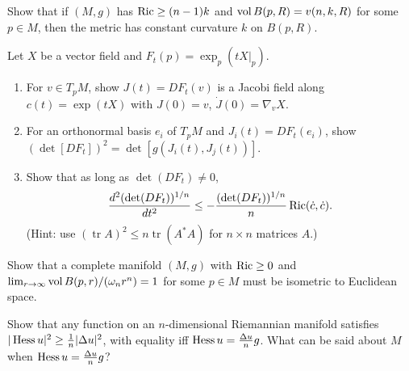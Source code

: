 \begin{remark}
  \label{rem:pet-ch7-ex-8}
  Show that if $(M,g)$ has $\operatorname{Ric}\ge(n-1)k$ and $\operatorname{vol} B(p,R)=v(n,k,R)$ for some
  $p\in M$, then the metric has constant curvature $k$ on $B(p,R)$.
\end{remark}

\begin{remark}
  \label{rem:pet-ch7-ex-9}
  Let $X$ be a vector field and $F_t(p)=\exp_p(tX|_p)$.
  \begin{enumerate}
    \item[(1)] For $v\in T_pM$, show $J(t)=DF_t(v)$ is a Jacobi field along
      $c(t)=\exp(tX)$ with $J(0)=v$, $\dot J(0)=\nabla_vX$.
    \item[(2)] For an orthonormal basis $e_i$ of $T_pM$ and $J_i(t)=DF_t(e_i)$,
      show $(\det[DF_t])^2=\det[g(J_i(t),J_j(t))]$.
    \item[(3)] Show that as long as $\det(DF_t)\ne0$,
      \[
        \frac{d^2(\det(DF_t))^{1/n}}{dt^2}
        \le-\frac{(\det(DF_t))^{1/n}}{n}\operatorname{Ric}(\dot c,\dot c).
      \]
      (Hint: use $(\operatorname{tr}A)^2\le n\operatorname{tr}(A^*A)$ for
      $n\times n$ matrices $A$.)
  \end{enumerate}
\end{remark}

\begin{remark}
  \label{rem:pet-ch7-ex-10}
  Show that a complete manifold $(M,g)$ with $\operatorname{Ric}\ge0$ and
  $\lim_{r\to\infty}\operatorname{vol} B(p,r)/(\omega_nr^n)=1$ for some $p\in M$ must be
  isometric to Euclidean space.
\end{remark}

\begin{remark}
  \label{rem:pet-ch7-ex-11}
  Show that any function on an $n$-dimensional Riemannian manifold satisfies
  $|\operatorname{Hess} u|^2\ge\tfrac1n|\Delta u|^2$, with equality iff
  $\operatorname{Hess} u=\tfrac{\Delta u}{n}g$. What can be said about $M$ when
  $\operatorname{Hess} u=\tfrac{\Delta u}{n}g$?
\end{remark}


